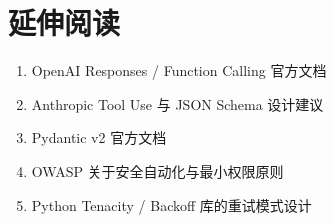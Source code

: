 \section{延伸阅读}

\begin{enumerate}[leftmargin=2em]
\item OpenAI Responses / Function Calling 官方文档
\item Anthropic Tool Use 与 JSON Schema 设计建议
\item Pydantic v2 官方文档
\item OWASP 关于安全自动化与最小权限原则
\item Python Tenacity / Backoff 库的重试模式设计
\end{enumerate}

